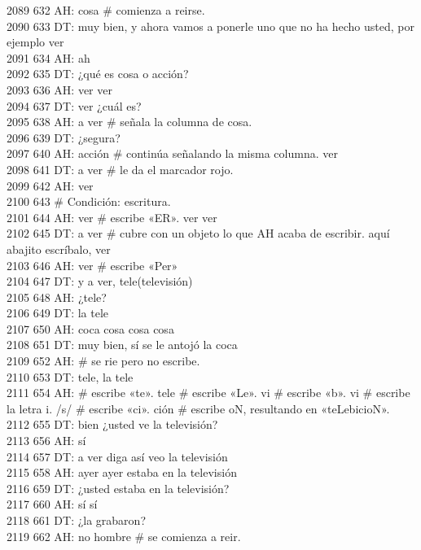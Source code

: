 2089 632 AH: cosa # comienza a reirse.\\
2090 633 DT: muy bien, y ahora vamos a ponerle uno que no ha hecho usted, por ejemplo ver\\
2091 634 AH: ah\\
2092 635 DT: ¿qué es cosa o acción?\\
2093 636 AH: ver ver\\
2094 637 DT: ver ¿cuál es?\\
2095 638 AH: a ver # señala la columna de cosa.\\
2096 639 DT: ¿segura?\\
2097 640 AH: acción # continúa señalando la misma columna. ver\\
2098 641 DT: a ver # le da el marcador rojo.\\
2099 642 AH: ver\\
2100 643 # Condición: escritura.\\
2101 644 AH: ver # escribe «ER». ver ver \\
2102 645 DT: a ver # cubre con un objeto lo que AH acaba de escribir. aquí abajito escríbalo, ver\\
2103 646 AH: ver # escribe «Per»\\
2104 647 DT: y a ver, tele(televisión)\\
2105 648 AH: ¿tele?\\
2106 649 DT: la tele\\
2107 650 AH: coca cosa cosa cosa\\
2108 651 DT: muy bien, sí se le antojó la coca\\
2109 652 AH: # se rie pero no escribe.\\
2110 653 DT: tele, la tele\\
2111 654 AH: # escribe «te». tele # escribe «Le». vi # escribe «b». vi # escribe la letra i. /s/ # escribe «ci». ción # escribe oN, resultando en «teLebicioN».\\
2112 655 DT: bien ¿usted ve la televisión?\\
2113 656 AH: sí\\
2114 657 DT: a ver diga así veo la televisión\\
2115 658 AH: ayer ayer estaba en la televisión\\
2116 659 DT: ¿usted estaba en la televisión?\\
2117 660 AH: sí sí\\
2118 661 DT: ¿la grabaron?\\
2119 662 AH: no hombre # se comienza a reir.\\
